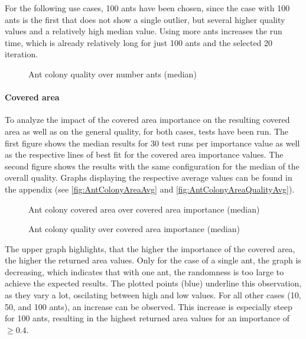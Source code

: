 For the following use cases, 100 ants have been chosen, since the case with 100 ants is the first that does not show a single outlier, but several higher quality values and a relatively high median value. 
Using more ants increases the run time, which is already relatively long for just 100 ants and the selected 20 iteration. 

\begin{figure}[H]
	\centering
	
	\caption{Ant colony quality over number ants (median)}
	\label{fig:AntColonyQualityAnts}
\end{figure}




\paragraph{Covered area}

To analyze the impact of the covered area importance on the resulting covered area as well as on the general quality, for both cases, tests have been run.
The first figure shows the median results for 30 test runs per importance value as well as the respective lines of best fit for the covered area importance values.
The second figure shows the results with the same configuration for the median of the overall quality.
Graphs displaying the respective average values can be found in the appendix (see \ref{fig:AntColonyAreaAvg} and \ref{fig:AntColonyAreaQualityAvg}).

\begin{figure}[H]
	\centering
	
	\caption{Ant colony covered area over covered area importance (median)}
	\label{fig:AntColonyAreaMed}
\end{figure}

\begin{figure}[H]
	\centering
	
	\caption{Ant colony quality over covered area importance (median)}
	\label{fig:AntColonyAreaQualityMed}
\end{figure}

The upper graph highlights, that the higher the importance of the covered area, the higher the returned area values.
Only for the case of a single ant, the graph is decreasing, which indicates that with one ant, the randomness is too large to achieve the expected results.
The plotted points (blue) underline this observation, as they vary a lot, oscilating between high and low values.
For all other cases (10, 50, and 100 ants), an increase can be observed.
This increase is especially steep for 100 ants, resulting in the highest returned area values for an importance of $\geq 0.4$.


